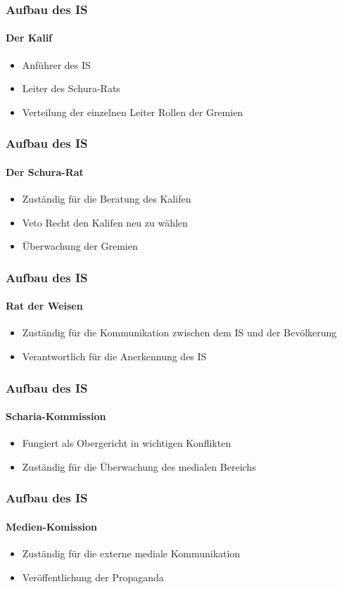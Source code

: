 \documentclass[10pt,a4paper]{beamer}
\begin{document}
\begin{frame}
\frametitle{Aufbau des IS}
\framesubtitle{Der Kalif}
\begin{itemize}
	\item Anführer des IS
	\pause
	\item Leiter des Schura-Rats
	\pause
	\item Verteilung der einzelnen Leiter Rollen der Gremien
\end{itemize}
\end{frame}

\begin{frame}
\frametitle{Aufbau des IS}
\framesubtitle{Der Schura-Rat}
\begin{itemize}
	\item Zuständig für die Beratung des Kalifen
	\pause
	\item Veto Recht den Kalifen neu zu wählen
	\pause
	\item Überwachung der Gremien
\end{itemize}
\end{frame}

\begin{frame}
\frametitle{Aufbau des IS}
\framesubtitle{Rat der Weisen}
\begin{itemize}
	\item Zuständig für die Kommunikation zwischen dem IS und der Bevölkerung
	\pause
	\item Verantwortlich für die Anerkennung des IS
\end{itemize}
\end{frame}

\begin{frame}
\frametitle{Aufbau des IS}
\framesubtitle{Scharia-Kommission}
\begin{itemize}
	\item Fungiert als Obergericht in wichtigen Konflikten
	\pause
	\item Zuständig für die Überwachung des medialen Bereichs
\end{itemize}
\end{frame}

\begin{frame}
\frametitle{Aufbau des IS}
\framesubtitle{Medien-Komission}
\begin{itemize}
	\item Zuständig für die externe mediale Kommunikation
	\pause
	\item Veröffentlichung der Propaganda
\end{itemize}
\end{frame}
\end{document}

